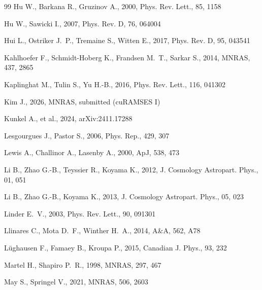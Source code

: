 \documentclass[11pt,a4paper]{article}
\begin{document}
\begin{thebibliography}{99}
Hu W., Barkana R., Gruzinov A., 2000, Phys. Rev. Lett., 85, 1158

Hu W., Sawicki I., 2007, Phys. Rev. D, 76, 064004

Hui L., Ostriker J.~P., Tremaine S., Witten E., 2017, Phys. Rev. D, 95, 043541

Kahlhoefer F., Schmidt-Hoberg K., Frandsen M.~T., Sarkar S., 2014, MNRAS, 437, 2865

Kaplinghat M., Tulin S., Yu H.-B., 2016, Phys. Rev. Lett., 116, 041302

Kim J., 2026, MNRAS, submitted (cuRAMSES I)

Kunkel A., et al., 2024, arXiv:2411.17288

Lesgourgues J., Pastor S., 2006, Phys. Rep., 429, 307

Lewis A., Challinor A., Lasenby A., 2000, ApJ, 538, 473

Li B., Zhao G.-B., Teyssier R., Koyama K., 2012, J. Cosmology Astropart. Phys., 01, 051

Li B., Zhao G.-B., Koyama K., 2013, J. Cosmology Astropart. Phys., 05, 023

Linder E.~V., 2003, Phys. Rev. Lett., 90, 091301

Llinares C., Mota D.~F., Winther H.~A., 2014, A\&A, 562, A78

L\"ughausen F., Famaey B., Kroupa P., 2015, Canadian J. Phys., 93, 232

Martel H., Shapiro P.~R., 1998, MNRAS, 297, 467

May S., Springel V., 2021, MNRAS, 506, 2603


\end{thebibliography}
\end{document}
